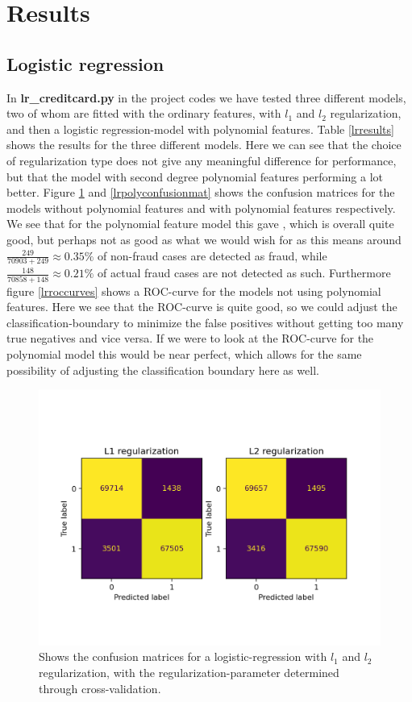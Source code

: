 \documentclass{article}
\begin{document}
\section{Results}
\subsection{Logistic regression}
In \textbf{lr\_creditcard.py} in the project codes \cite{githubrepoproject3} we
have tested three different models, two of whom are fitted with the ordinary
features, with $l_1$ and $l_2$ regularization, and then a logistic
regression-model with polynomial features. Table \ref{lrresults} shows the
results for the three different models. Here we can see that the choice of
regularization type does not give any meaningful difference for performance,
but that the model with second degree polynomial features performing a lot
better. Figure \ref{lrconfusionmats} and \ref{lrpolyconfusionmat} shows
the confusion matrices for the models without polynomial features and with
polynomial features respectively. We see that for the polynomial feature model
this gave , which is overall quite good, but perhaps not as good as what we
would wish for as this means around $\frac{249}{70903+249} \approx 0.35\%$ of
non-fraud cases are detected as fraud, while $\frac{148}{70858 + 148} \approx
	0.21\%$ of actual fraud cases are not detected as such. Furthermore figure
\ref{lrroccurves} shows a ROC-curve for the models not using polynomial
features. Here we see that the ROC-curve is quite good, so we could adjust the
classification-boundary to minimize the false positives without getting too
many true negatives and vice versa. If we were to look at the ROC-curve for the
polynomial model this would be near perfect, which allows for the same
possibility of adjusting the classification boundary here as well.

\begin{figure}
	\centering
	\includegraphics[scale=0.8]{lr_confusion_mat}
	\caption{Shows the confusion matrices for a logistic-regression with
		$l_1$ and $l_2$ regularization, with the regularization-parameter
		determined through cross-validation.}
	\label{lrconfusionmats}
\end{figure}
\end{document}

